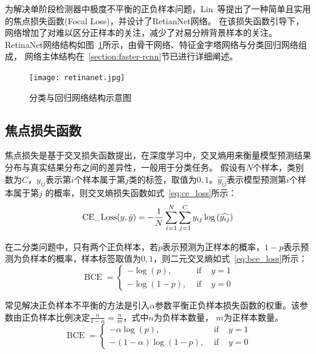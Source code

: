 为解决单阶段检测器中极度不平衡的正负样本问题，Lin~\cite{lin2017focal}等提出了一种简单且实用的焦点损失函数(Focal Loss)，并设计了RetianNet网络。
在该损失函数引导下，网络增加了对难以区分正样本的关注，减少了对易分辨背景样本的关注。RetinaNet网络结构如图~\ref{fig:retinanet}所示，由骨干网络、特征金字塔网络与分类回归网络组成，
网络主体结构在~\ref{section:faster-rcnn}节已进行详细阐述。

\begin{figure}[htbp]                     
  \centering                      
  \texttt{[image: retinanet.jpg]}                      
  \caption{分类与回归网络结构示意图}                      
  \label{fig:retinanet}       
\end{figure}   

\subsection{焦点损失函数}
焦点损失是基于交叉损失函数提出，在深度学习中，交叉熵用来衡量模型预测结果分布与真实结果分布之间的差异性，一般用于分类任务。
假设有$N$个样本，类别数为$C$，$y_{ij}$表示第$i$个样本属于第$j$类的标签，取值为$0, 1$。$\hat{y_{ij}}$表示模型预测第$i$个样本属于第$j$
的概率，则交叉熵损失函数如式~\ref{eq:ce_loss}所示：
\begin{equation}   
  {\rm{CE}}\_{\rm{Loss}}(y,\hat y) =  - \frac{1}{N}\sum\limits_{i = 1}^N {\sum\limits_{j = 1}^C {{y_{ij}}} } \log \left( {\widehat {{y_{ij}}}} \right)
  \label{eq:ce_loss} 
\end{equation}

在二分类问题中，只有两个正负样本，若$p$表示预测为正样本的概率，$1-p$表示预测为负样本的概率，样本标签取值为$0,1$，则二元交叉熵如式~\ref{eq:bce_loss}所示：
\begin{equation}         
  \operatorname{BCE}=\left\{\begin{array}{ccc} -\log (p), & \text { if } & y=1 \\ -\log (1-p), & \text { if } & y=0 \end{array}\right.  
  \label{eq:bce_loss}   
\end{equation} 

常见解决正负样本不平衡的方法是引入$\alpha$参数平衡正负样本损失函数的权重。该参数由正负样本比例决定$\frac{\alpha}{1-\alpha} = \frac{n}{m}$，式中$n$为负样本数量，
$m$为正样本数量。
\begin{equation}            
  \operatorname{BCE}=\left\{\begin{array}{ccc} -\alpha \log (p), & \text { if } & y=1 \\ -(1-\alpha) \log (1-p), & \text { if } & y=0 \end{array}\right.    
  \label{eq:bce_loss_alpha}    
\end{equation} 

